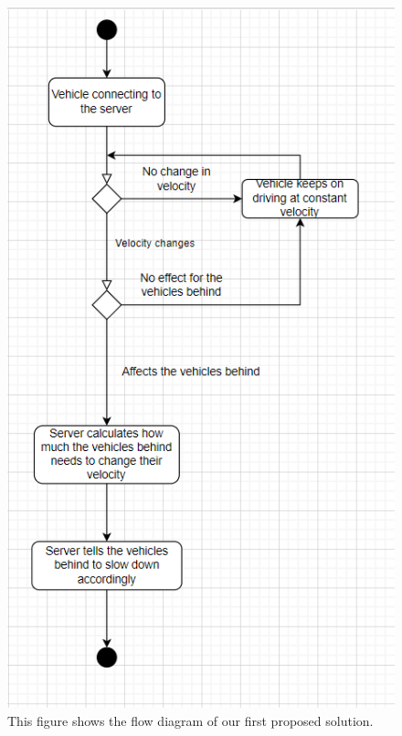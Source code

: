 \begin{figure}[h!]
	\centering
	\includegraphics[width=0.9\linewidth]{figures/flow_diagram_first}
	\caption[Flow diagram server]{This figure shows the flow diagram of our first proposed solution. }
	\label{fig:diagramfirst}
\end{figure}